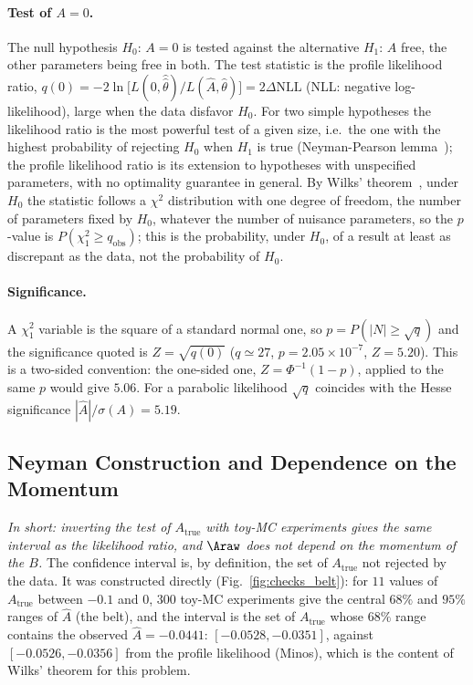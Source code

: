 \paragraph{Test of $A=0$.}
The null hypothesis $H_0$: $A=0$ is tested against the alternative $H_1$: $A$ free, the other parameters being free in both. The test statistic is the profile likelihood ratio,
$q(0)=-2\ln\big[L(0,\hat{\hat\theta})/L(\hat A,\hat\theta)\big]=2\Delta\mathrm{NLL}$ (NLL: negative log-likelihood), large when the data disfavor $H_0$. For two simple hypotheses the likelihood ratio is the most powerful test of a given size, i.e.\ the one with the highest probability of rejecting $H_0$ when $H_1$ is true (Neyman-Pearson lemma~\cite{neyman_pearson}); the profile likelihood ratio is its extension to hypotheses with unspecified parameters, with no optimality guarantee in general. By Wilks' theorem~\cite{wilks}, under $H_0$ the statistic follows a $\chi^2$ distribution with one degree of freedom, the number of parameters fixed by $H_0$, whatever the number of nuisance parameters, so the $p$-value is $P(\chi^2_1\geq q_{\mathrm{obs}})$; this is the probability, under $H_0$, of a result at least as discrepant as the data, not the probability of $H_0$.
\paragraph{Significance.}
A $\chi^2_1$ variable is the square of a standard normal one, so $p=P(|N|\geq\sqrt{q})$ and the significance quoted is $Z=\sqrt{q(0)}$ ($q\simeq27$, $p=2.05\times10^{-7}$, $Z=5.20$). This is a two-sided convention: the one-sided one, $Z=\Phi^{-1}(1-p)$, applied to the same $p$ would give $5.06$. For a parabolic likelihood $\sqrt{q}$ coincides with the Hesse significance $|\hat A|/\sigma(A)=5.19$.
\subsection{Neyman Construction and Dependence on the Momentum}
\label{sec:checks_belt}
\emph{In short: inverting the test of $A_{\mathrm{true}}$ with toy-MC experiments gives the same interval as the likelihood ratio, and $\Araw$ does not depend on the momentum of the $B$.}
The confidence interval is, by definition, the set of $A_{\mathrm{true}}$ not rejected by the data. It was constructed directly (Fig.~\ref{fig:checks_belt}): for $11$ values of $A_{\mathrm{true}}$ between $-0.1$ and $0$, $300$ toy-MC experiments give the central $68\%$ and $95\%$ ranges of $\hat A$ (the belt), and the interval is the set of $A_{\mathrm{true}}$ whose $68\%$ range contains the observed $\hat A=-0.0441$: $[-0.0528,-0.0351]$, against $[-0.0526,-0.0356]$ from the profile likelihood (Minos), which is the content of Wilks' theorem for this problem.

